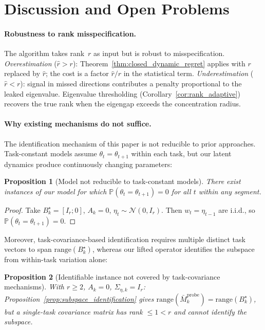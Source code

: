 \documentclass[11pt]{article}
\newcommand{\Prob}{\mathbb{P}}
\newcommand{\range}{\mathrm{range}}
\newtheorem{proposition}{Proposition}
\begin{document}
\section{Discussion and Open Problems}
\label{sec:discussion}

\paragraph{Robustness to rank misspecification.}
The algorithm takes rank~$r$ as input but is robust to misspecification.
\emph{Overestimation} ($\hat{r}>r$): Theorem~\ref{thm:closed_dynamic_regret}
applies with $r$ replaced by $\hat{r}$; the cost is a factor $\hat{r}/r$ in the
statistical term.
\emph{Underestimation} ($\hat{r}<r$): signal in missed directions contributes a
penalty proportional to the leaked eigenvalue.
Eigenvalue thresholding (Corollary~\ref{cor:rank_adaptive}) recovers the true rank
when the eigengap exceeds the concentration radius.

\paragraph{Why existing mechanisms do not suffice.}
The identification mechanism of this paper is not reducible to prior approaches.
Task-constant models assume $\theta_t=\theta_{t+1}$ within each task,
but our latent dynamics produce continuously changing parameters:

\begin{proposition}[Model not reducible to task-constant models]
\label{prop:separation_qin_1}
There exist instances of our model for which
$\Prob(\theta_t=\theta_{t+1})=0$ for all $t$ within any segment.
\end{proposition}

\begin{proof}
Take $B_k^\star=[I_r;0]$, $A_k=0$, $\eta_t\sim\mathcal{N}(0,I_r)$.
Then $w_t=\eta_{t-1}$ are i.i.d., so $\Prob(\theta_t=\theta_{t+1})=0$.
\end{proof}

\noindent Moreover, task-covariance-based identification requires multiple
distinct task vectors to span $\range(B_k^\star)$, whereas our lifted
operator identifies the subspace from within-task variation alone:

\begin{proposition}[Identifiable instance not covered by task-covariance mechanisms]
\label{prop:separation_qin_2}
With $r\ge 2$, $A_k=0$, $\Sigma_{\eta,k}=I_r$:
Proposition~\ref{prop:subspace_identification} gives
$\range(\bar{M}_k^{\mathrm{probe}})=\range(B_k^\star)$,
but a single-task covariance matrix has rank $\le 1<r$ and cannot identify the subspace.
\end{proposition}
\end{document}
